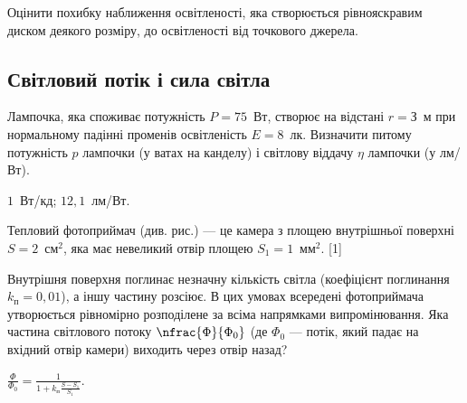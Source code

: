 \begin{problem}%
Оцінити похибку наближення освітленості, яка створюється
рівнояскравим диском деякого розміру, до освітленості від точкового
джерела.
\end{problem}






\subsection*{Світловий потік і сила світла}


\begin{problem}%
Лампочка, яка споживає потужність $P  = 75$~Вт, створює на відстані $r
	= З$~м при нормальному падінні променів освітленість $E = 8$~лк.
Визначити питому потужність $p$ лампочки (у ватах на канделу) і
світлову віддачу $\eta$ лампочки (у лм/Вт).
\begin{solution}
	$1$~Вт/кд;  $12,1$~лм/Вт.
\end{solution}
\end{problem}


\begin{problem}%
Тепловий фотоприймач (див. рис.) --- це камера з
площею внутрішньої поверхні $S = 2$~см$^2$, яка має
невеликий отвір площею $S_1 =1$~мм$^2$.
[1]

Внутрішня поверхня поглинає незначну кількість світла
(коефіцієнт поглинання $k_\text{п} = 0,01$), а іншу частину розсіює. В цих
умовах всередені фотоприймача утворюється рівномірно розподілене за
всіма напрямками випромінювання. Яка частина світлового потоку
$\nfrac{\Phi}{\Phi_0}$ (де $\Phi_0$ --- потік, який падає на вхідний отвір камери) виходить
через отвір назад?

%	


\begin{solution}
	$\frac{\Phi}{\Phi_0} = \frac{1}{1 + k_\text{п}\frac{S - S_1}{S_1}}$.
\end{solution}
\end{problem}


